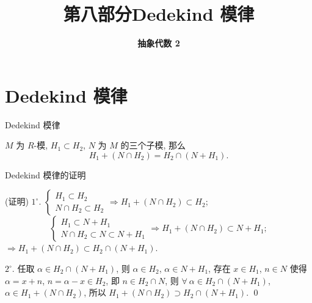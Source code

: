 \everymath{\displaystyle}



\title[第八部分\\
Dedekind 模律]{\texorpdfstring{\LARGE \bfseries 第八部分\quad Dedekind 模律}{第八部分 Dedekind 模律}}
\author[抽象代数 2]{\Large \bfseries 抽象代数 2}
\date{}





\begin{frame}

\titlepage %

\end{frame}


\section[模律]{Dedekind 模律}


\begin{frame}{Dedekind 模律}

\begin{thm}[Dedekind 模律]
$M$ 为 $R$-模, $H_1 \subset H_2$, $N$ 为 $M$ 的三个子模, 那么
\[
H_1 + (N \cap H_2) = H_2 \cap (N + H_1).
\]
\end{thm}

\end{frame}


\begin{frame}{Dedekind 模律的证明}

\startproof[bg=yellow, fg=red](证明)
$1^{\circ}$.
$\begin{cases} H_1 \subset H_2 \\ N \cap H_2 \subset H_2 \end{cases}
\Longrightarrow H_1 + (N \cap H_2) \subset H_2$;
\[
\begin{cases} H_1 \subset N + H_1 \\ N \cap H_2 \subset N \subset N + H_1 \end{cases}
\Longrightarrow H_1 + (N \cap H_2) \subset N + H_1 ;
\]
$\Longrightarrow H_1 + (N \cap H_2) \subset H_2 \cap (N + H_1)$.

\pause

$2^{\circ}$. 任取 $\alpha \in H_2 \cap (N + H_1)$,
则 $\alpha \in H_2$, $\alpha \in N + H_1$, 存在 $x \in H_1$, $n \in N$
使得 $\alpha = x + n$, $n = \alpha - x \in H_2$, 即 $n \in H_2 \cap N$,
则 $\forall\ \alpha \in H_2 \cap (N + H_1)$, $\alpha \in H_1 + (N \cap H_2)$,
所以 $H_1 + (N \cap H_2) \supset H_2 \cap (N + H_1)$.
\qed

\end{frame}

